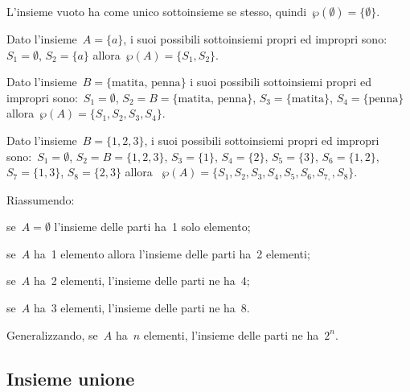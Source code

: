 \begin{exrig}
 \begin{esempio}
 L'insieme vuoto ha come unico sottoinsieme se stesso,
quindi~\(\wp (\emptyset )=\{\emptyset \}\).
 \end{esempio}

\begin{esempio}
 Dato l'insieme~\(A=\{a\}\), i suoi possibili sottoinsiemi
propri ed impropri sono:~\(S_{1}=\emptyset\), \(S_{2}=\{a\}\)
allora~\(\wp (A)=\{S_{1},S_{2}\}\).
 \end{esempio}

\begin{esempio}
 Dato l'insieme~\(B=\{\text{matita, penna}\}\) i
suoi possibili sottoinsiemi propri ed impropri sono:~\(S_{1}=\emptyset\),
\(S_{2}=B=\{\text{matita, penna}\}\), \(S_{3}=\{\text{matita}\}\),
\(S_{4}=\{\text{penna}\}\)
allora~\(\wp (A)=\{S_{1}, S_{2}, S_{3}, S_{4}\}\).
 \end{esempio}

\begin{esempio}
 Dato l'insieme~\(B=\{1,2,3\}\), i suoi possibili
sottoinsiemi propri ed impropri sono:~\(S_{1}=\emptyset\),
\(S_{2}=B=\{1,2,3\}\), \(S_{3}=\{1\}\), \(S_{4}=\{2\}\), \(S_{5}=\{3\}\),
\(S_{6}=\{1,2\}\), \(S_{7}=\{1,3\}\), \(S_{8}=\{2,3\}\)
allora~
\(\wp (A)=\{S_{1}, S_{2}, S_{3}, S_{4}, S_{5}, S_{6}, S_{7,}, S_{8}\}\).
 \end{esempio}
 \end{exrig}

 Riassumendo:
\begin{itemize*}
\item se~\(A=\emptyset \) l'insieme delle parti ha~1 solo elemento;
\item se~\(A\) ha~1 elemento allora l'insieme delle parti ha~2 elementi;
\item se~\(A\) ha~2 elementi, l'insieme delle parti ne ha~4;
\item se~\(A\) ha~3 elementi, l'insieme delle parti ne ha~8.
\end{itemize*}

Generalizzando, se~\(A\) ha~\(n\) elementi, l'insieme delle parti ne 
ha~\(2^{n}\).


\subsection{Insieme unione}
\label{subsec:op_unione}

